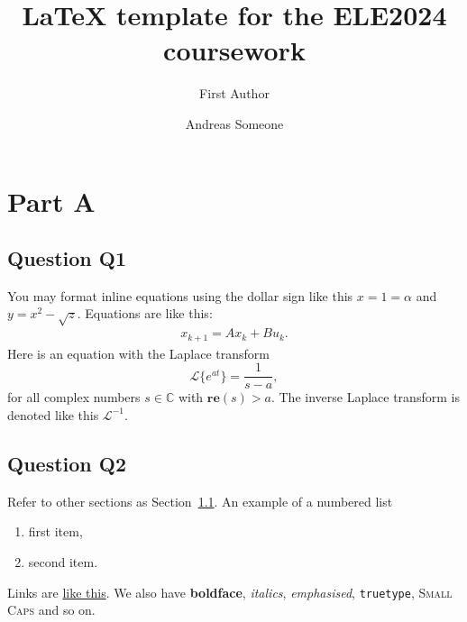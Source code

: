 \documentclass[a4paper,11pt,reqno]{amsart}
\title[ELE2024 Coursework]{LaTeX template for the ELE2024 coursework}
\author[F. Author]{First Author}
\author[A. Someone]{Andreas Someone}
\renewcommand{\Re}{\mathbf{re}}
\newcommand{\C}{\mathbb{C}}
\newcommand{\lap}{\mathscr{L}}
\begin{document}
\maketitle


\section{Part A}

\subsection{Question Q1}\label{sec:q1}
You may format inline equations using the dollar sign 
like this $x = 1 = \alpha$ and $y = x^2 - \sqrt{z}$. 
Equations are like this:
\begin{align}
 \label{eq:lti_state_update}
 x_{k+1} = A x_k + Bu_k.
\end{align}
Here is an equation with the Laplace transform
\begin{equation}
    \lap \{e^{at}\} = \frac{1}{s-a},
\end{equation}
for all complex numbers $s\in\C$ with $\Re(s)>a$.
The inverse Laplace transform is denoted like this $\lap^{-1}$.




\subsection{Question Q2}
Refer to other sections as Section~\ref{sec:q1}. An example of a numbered list
\begin{enumerate}
 \item first item,
 \item second item.
\end{enumerate}
Links are \href{https://google.com}{like this}. We also have \textbf{boldface}, \textit{italics},
\emph{emphasised}, \texttt{truetype}, \textsc{Small Caps} and so on.
\end{document}

